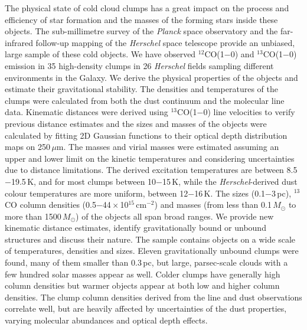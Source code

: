 \documentclass[printer]{aa}
\begin{document}
  \abstract
   {The physical state of cold cloud clumps has a great impact on the process and efficiency of star formation and the masses of the forming stars inside these objects. The sub-millimetre survey of the \textit{Planck} space observatory and the far-infrared follow-up mapping of the \textit{Herschel} space telescope provide an unbiased, large sample of these cold objects.}
   {We have observed $^{12}$CO(1$-$0) and $^{13}$CO(1$-$0) emission in 35 high-density clumps in 26 \textit{Herschel} fields sampling different environments in the Galaxy. We derive the physical properties of the objects and estimate their gravitational stability.}
   {The densities and temperatures of the clumps were calculated from both the dust continuum and the molecular line data. Kinematic distances were derived using $^{13}$CO(1$-$0) line velocities to verify previous distance estimates and the sizes and masses of the objects were calculated by fitting 2D Gaussian functions to their optical depth distribution maps on 250\,$\mu$m. The masses and virial masses were estimated assuming an upper and lower limit on the kinetic temperatures and considering uncertainties due to distance limitations.}
   {The derived excitation temperatures are between 8.5$-$19.5\,K, and for most clumps between 10$-$15\,K, while the \textit{Herschel}-derived dust colour temperatures are more uniform, between 12$-$16\,K. The sizes (0.1$-$3\,pc), $^{13}$CO column densities (0.5$-$44\,$\times$\,10$^{15}$\,cm$^{-2}$) and masses (from less than 0.1\,$M_{\odot}$ to more than 1500\,$M_{\odot}$) of the objects all span broad ranges. We provide new kinematic distance estimates, identify gravitationally bound or unbound structures and discuss their nature.}
  {The sample contains objects on a wide scale of temperatures, densities and sizes. Eleven gravitationally unbound clumps were found, many of them smaller than 0.3\,pc, but large, parsec-scale clouds with a few hundred solar masses appear as well. Colder clumps have generally high column densities but warmer objects appear at both low and higher column densities. The clump column densities derived from the line and dust observations correlate well, but are heavily affected by uncertainties of the dust properties, varying molecular abundances and optical depth effects.}
   \maketitle
\end{document}
